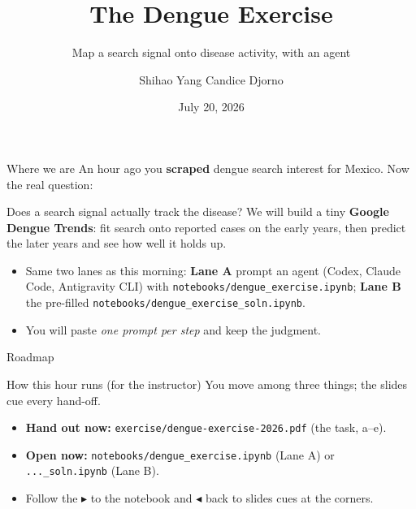 \documentclass[aspectratio=169,11pt]{beamer}
\title{The Dengue Exercise}
\subtitle{Map a search signal onto disease activity, with an agent}
\author{Shihao Yang \quad\textbullet\quad Candice Djorno}
\institute{SISMID 2026 \textbullet\ Day 1, 11:00}
\date{July 20, 2026}
\begin{document}
\begin{frame}
  \titlepage
\end{frame}

\begin{frame}{Where we are}
  An hour ago you \textbf{scraped} dengue search interest for Mexico. Now the real
  question:
  \begin{block}{Does a search signal actually track the disease?}
    We will build a tiny \textbf{Google Dengue Trends}: fit search onto reported cases on
    the early years, then predict the later years and see how well it holds up.
  \end{block}
  \vspace{0.4em}
  \begin{itemize}
    \item Same two lanes as this morning: \textbf{Lane A} prompt an agent (Codex, Claude
          Code, Antigravity CLI) with \texttt{notebooks/dengue\_exercise.ipynb};
          \textbf{Lane B} the pre-filled \texttt{notebooks/dengue\_exercise\_soln.ipynb}.
    \item You will paste \emph{one prompt per step} and keep the judgment.
  \end{itemize}
\end{frame}

\begin{frame}{Roadmap}
  \tableofcontents
\end{frame}

\begin{frame}{How this hour runs (for the instructor)}
  You move among three things; the slides cue every hand-off.
  \begin{center}
  \end{center}
  \begin{itemize}
    \item \textbf{Hand out now:} \texttt{exercise/dengue-exercise-2026.pdf} (the task, a--e).
    \item \textbf{Open now:} \texttt{notebooks/dengue\_exercise.ipynb} (Lane A) or
          \texttt{...\_soln.ipynb} (Lane B).
    \item Follow the \textcolor{AccentB}{$\blacktriangleright$ to the notebook} and
          \textcolor{AccentC}{$\blacktriangleleft$ back to slides} cues at the corners.
  \end{itemize}
\end{frame}
\end{document}
